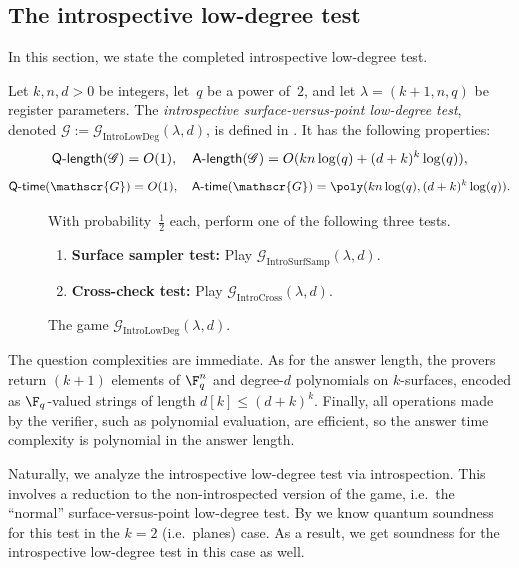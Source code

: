 \documentclass[11pt]{article}
\newcommand{\game}{\mathscr{G}}
\newcommand{\qtime}[1]{\mathsf{Q}\textnormal{-}\mathsf{time}(#1)}
\newcommand{\atime}[1]{\mathsf{A}\textnormal{-}\mathsf{time}(#1)}
\newcommand{\qlength}[1]{\mathsf{Q}\textnormal{-}\mathsf{length}(#1)}
\newcommand{\alength}[1]{\mathsf{A}\textnormal{-}\mathsf{length}(#1)}
\begin{document}
\subsection{The introspective low-degree test}\label{sec:big-low-degree-subsection}

In this section, we state the completed introspective low-degree test.

\begin{definition}
Let $k, n, d>0$ be integers, let~$q$ be a power of~$2$,
and let $\lambda = (k+1, n, q)$ be register parameters.
The \emph{introspective surface-versus-point low-degree test},
denoted $\game:=\game_{\mathrm{IntroLowDeg}}(\lambda, d)$, is defined in .
It has the following properties:
\begin{equation*}
\qlength{\game} = O(1), \quad
\alength{\game} = O(k n \log(q) + (d+k)^k \log(q)),
\end{equation*}
\begin{equation*}
\qtime{\game} = O(1), \quad
\atime{\game} = \poly(k n \log(q), (d+k)^k \log(q)).
\end{equation*}
\end{definition}
{
\begin{figure}
With probability~$\tfrac{1}{2}$ each, perform one of the following three tests.
\begin{enumerate}
	\item \textbf{Surface sampler test:} Play $\game_{\mathrm{IntroSurfSamp}}(\lambda, d)$.
	\item \textbf{Cross-check test:} Play $\game_{\mathrm{IntroCross}}(\lambda, d)$.
	\end{enumerate}
	\caption{The game $\game_{\mathrm{IntroLowDeg}}(\lambda, d)$.\label{fig:big-low-degree}}
\end{figure}
}

The question complexities are immediate.
As for the answer length, the provers return $(k+1)$ elements of $\F_q^{n}$ and degree-$d$ polynomials on $k$-surfaces,
encoded as $\F_q$-valued strings of length $d[k] \leq (d+k)^k$.
Finally, all operations made by the verifier, such as polynomial evaluation, are efficient, so the answer time complexity is polynomial in the answer length.

Naturally, we analyze the introspective low-degree test
via introspection.
This involves a reduction to the non-introspected version of the game,
i.e.\ the ``normal'' surface-versus-point low-degree test.
By  we know quantum soundness for this test in the $k = 2$ (i.e.\ planes) case.
As a result, we get soundness for the introspective low-degree test in this case as well.
\end{document}
